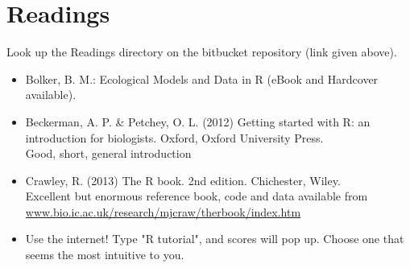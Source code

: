 \section{Readings}

Look up the Readings directory on the bitbucket repository (link 
given above).

\begin{itemize}\itemsep2pt{}
	\item Bolker, B. M.: Ecological Models and Data in R (eBook and 
	Hardcover available).
	\item Beckerman, A. P. \& Petchey, O. L. (2012) Getting started 
	with R: an introduction for biologists. Oxford, Oxford University 
	Press. \\ Good, short, general introduction
	\item Crawley, R. (2013) The R book. 2nd edition. Chichester, Wiley. \\
	Excellent but enormous reference book, code and data available from
	\url{www.bio.ic.ac.uk/research/mjcraw/therbook/index.htm}
	\item Use the internet! Type "R tutorial", and scores will pop up. 
	Choose one that seems the most intuitive to you. 
\end{itemize}
